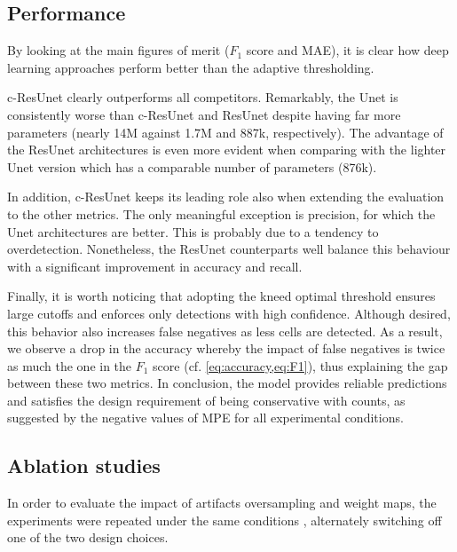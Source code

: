 \subsection{Performance}

By looking at the main figures of merit ($F_1$ score and MAE), it is clear how deep learning approaches perform better than the adaptive thresholding.

c-ResUnet clearly outperforms all competitors.
Remarkably, the Unet is consistently worse than c-ResUnet and ResUnet despite having far more parameters (nearly 14M against 1.7M and 887k, respectively).
The advantage of the ResUnet architectures is even more evident when comparing with the lighter Unet version which has a comparable number of parameters (876k).

In addition, c-ResUnet keeps its leading role also when extending the evaluation to the other metrics.
The only meaningful exception is precision, for which the Unet architectures are better. This is probably due to a tendency to overdetection. 
Nonetheless, the ResUnet counterparts well balance this behaviour with a significant improvement in accuracy and recall.

Finally, it is worth noticing that adopting the kneed optimal threshold ensures large cutoffs and enforces only detections with high confidence.
Although desired, this behavior also increases false negatives as less cells are detected. 
As a result, we observe a drop in the accuracy whereby the impact of false negatives is twice as much the one in the $F_1$ score (cf. \cref{eq:accuracy,eq:F1}), thus explaining the gap between these two metrics.
In conclusion, the model provides reliable predictions and satisfies the design requirement of being conservative with counts, as suggested by the negative values of MPE for all experimental conditions.

\subsection{Ablation studies}

In order to evaluate the impact of artifacts oversampling and weight maps, the experiments were repeated under the same conditions%
, alternately switching off one of the two design choices.

